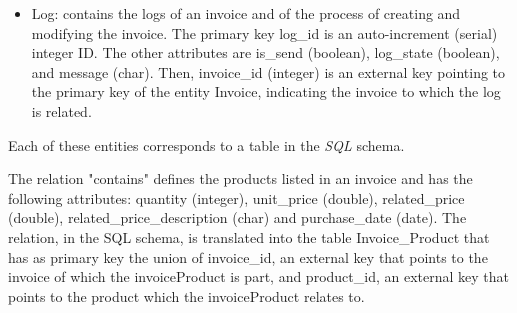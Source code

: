 \begin{itemize}
	\item Log: contains the logs of an invoice and of the process of creating and modifying the invoice. The primary key log\_id is an auto-increment (serial) integer ID. The other attributes are is\_send (boolean), log\_state (boolean), and message (char). Then, invoice\_id (integer) is an external key pointing to the primary key of the entity Invoice, indicating the invoice to which the log is related.
\end{itemize}
Each of these entities corresponds to a table in the \textit{SQL} schema.

The relation "contains" defines the products listed in an invoice and has the following attributes: quantity (integer), unit\_price (double), related\_price (double), related\_price\_description (char) and purchase\_date (date). The relation, in the SQL schema, is translated into the table Invoice\_Product that has as primary key the union of invoice\_id, an external key that points to the invoice of which the invoiceProduct is part, and product\_id, an external key that points to the product which the invoiceProduct relates to.


